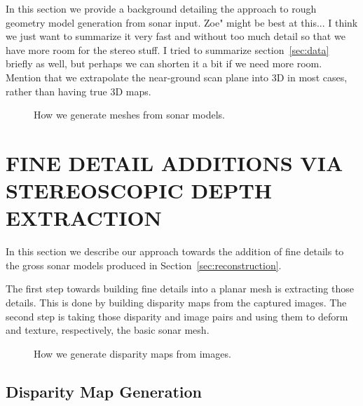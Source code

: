 \documentclass[a4paper,twoside]{article}
\begin{document}
\noindent In this section we provide a background detailing the approach to rough geometry model generation from sonar input. Zoe" might be best at this... I think we just want to summarize it very fast and without too much detail so that we have more room for the stereo stuff. I tried to summarize section~\ref{sec:data} briefly as well, but perhaps we can shorten it a bit if we need more room. Mention that we extrapolate the near-ground scan plane into 3D in most cases, rather than having true 3D maps.

\begin{figure*}[!ht]
   \vspace{-0.2cm}
   \caption{How we generate meshes from sonar models.}
  \label{fig:meshgen}
 \end{figure*}

\section{\uppercase{Fine Detail Additions Via Stereoscopic Depth Extraction}}
\label{sec:detail}

\noindent In this section we describe our approach towards the addition of fine details to the gross sonar models produced in Section~\ref{sec:reconstruction}. 

The first step towards building fine details into a planar mesh is extracting those details. 
This is done by building disparity maps from the captured images.
The second step is taking those disparity and image pairs and using them to deform and texture, respectively, the basic sonar mesh. 

\noindent

\begin{figure*}[!ht]
   \vspace{-0.2cm}
   \caption{How we generate disparity maps from images.}
  \label{fig:dispgen}
 \end{figure*}


\subsection{Disparity Map Generation}
\end{document}
